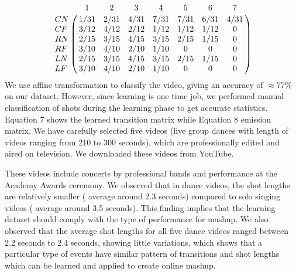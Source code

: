\documentclass{sig-alternate}
\begin{document}
\begin{equation}
    \bordermatrix{~ & 1 & 2 & 3 & 4 & 5 & 6 & 7 \cr 
        CN & 1/31 & 2/31 & 4/31 & 7/31 & 7/31 & 6/31 & 4/31 \cr
        CF & 3/12 & 4/12 & 2/12 & 1/12 & 1/12 & 1/12 & 0 \cr
        RN & 2/15 & 3/15 & 4/15 & 3/15 & 2/15 & 1/15 & 0 \cr
        RF & 3/10 & 4/10 & 2/10 & 1/10 & 0 & 0 & 0 \cr
        LN & 2/15 & 3/15 & 4/15 & 3/15 & 2/15 & 1/15 & 0 \cr
        LF & 3/10 & 4/10 & 2/10 & 1/10 & 0 & 0 & 0 \cr 
    }
\end{equation}
We use affine transformation to classify the video, giving an accuracy of $\approx 77\%$ on our dataset. However, since learning is one time job, we performed manual classification of shots during the learning phase to get accurate statistics. Equation 7 shows the learned transition matrix while Equation 8 emission matrix. We have carefully selected five videos (live group dances with length of videos ranging from 210 to 300 seconds), which are professionally edited and aired on television. We downloaded these videos from YouTube.

These videos include concerts by professional bands and performance at the Academy Awards ceremony. We observed that in dance videos, the shot lengths are relatively smaller ( average around 2.3 seconds) compared to solo singing videos ( average around 3.5 seconds). This finding implies that the learning dataset should comply with the type of performance for mashup. We also observed that the average shot lengths for all five dance videos ranged between 2.2 seconds to 2.4 seconds, showing little variations, which shows that a particular type of events have similar pattern of transitions and shot lengths which can be learned and applied to create online mashup.
\end{document}
